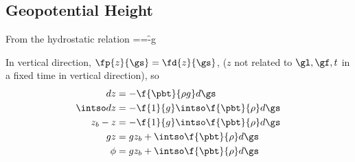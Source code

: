 \subsection{Geopotential Height}
\label{der:phi-sig}

From the hydrostatic relation
\beeq
{}==-\f{\pbt}{\rho g}
\eneq

In vertical direction, $\fp{z}{\gs}=\fd{z}{\gs}$, ($z$ not related to
$\gl,\gf,t$ in a fixed time in vertical direction), so
\begin{align}
dz &= -\f{\pbt}{\rho g}d\gs \\
\intso dz &= -\f{1}{g}\intso\f{\pbt}{\rho}d\gs \\
z_b - z &= -\f{1}{g}\intso\f{\pbt}{\rho}d\gs \\
gz &= g z_b +\intso\f{\pbt}{\rho}d\gs \\
\phi &= g z_b +\intso\f{\pbt}{\rho}d\gs
\end{align}
